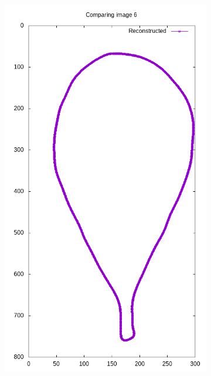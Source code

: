 \begin{frame}
\begin{figure}[ht!]
\begin{subfigure}[b]{0.19\textwidth}
			\includegraphics[width=\textwidth]{img/reconstructed.png}
		\end{subfigure}
		\label{fig:editedmesh}
	\end{figure}
	
\end{frame}



